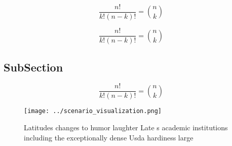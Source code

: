 \documentclass[a4paper]{article}
\begin{document}
\[ \frac{n!}{k!(n-k)!} = \binom{n}{k} \]

\[ \frac{n!}{k!(n-k)!} = \binom{n}{k} \]

\subsection{SubSection}

\[ \frac{n!}{k!(n-k)!} = \binom{n}{k} \]

\begin{figure}
\centering
\texttt{[image: ../scenario\_visualization.png]}
\caption{Latitudes changes to humor laughter Late s academic institutions including the exceptionally dense Usda hardiness large
}
\end{figure}
 
\end{document}
